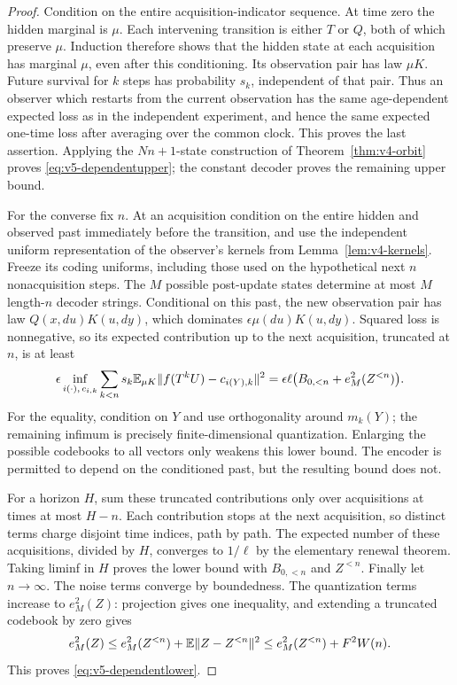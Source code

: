 \begin{proof}
Condition on the entire acquisition-indicator sequence. At time
zero the hidden marginal is $\mu$. Each intervening transition is
either $T$ or $Q$, both of which preserve $\mu$. Induction therefore
shows that the hidden state at each acquisition has marginal
$\mu$, even after this conditioning. Its observation pair has
law $\mu K$. Future survival for $k$ steps has probability $s_k$,
independent of that pair. Thus an observer which restarts from
the current observation has the same age-dependent expected loss
as in the independent experiment, and hence the same expected
one-time loss after averaging over the common clock. This proves
the last assertion. Applying the $Nn+1$-state construction of
Theorem~\ref{thm:v4-orbit} proves
\eqref{eq:v5-dependentupper}; the constant decoder proves the
remaining upper bound.

For the converse fix $n$. At an acquisition condition on the
entire hidden and observed past immediately before the transition,
and use the independent uniform representation of the observer's
kernels from Lemma~\ref{lem:v4-kernels}. Freeze its coding uniforms,
including those used on the hypothetical next $n$ nonacquisition
steps. The $M$ possible post-update states determine at most $M$
length-$n$ decoder strings. Conditional on this past, the new
observation pair has law $Q(x,du)K(u,dy)$, which dominates
$\epsilon\mu(du)K(u,dy)$. Squared loss is nonnegative, so its
expected contribution up to the next acquisition, truncated at
$n$, is at least
\[
 \epsilon\inf_{i(\cdot),\,c_{i,k}}
 \sum_{k<n}s_k\mathbb E_{\mu K}\|f(T^kU)-c_{i(Y),k}\|^2
 =\epsilon\ell\bigl(B_{0,<n}+e_M^2(Z^{<n})\bigr).
\]
For the equality, condition on $Y$ and use orthogonality around
$m_k(Y)$; the remaining infimum is precisely finite-dimensional
quantization. Enlarging the possible codebooks to all vectors
only weakens this lower bound. The encoder is permitted to depend
on the conditioned past, but the resulting bound does not.

For a horizon $H$, sum these truncated contributions only over
acquisitions at times at most $H-n$. Each contribution stops at
the next acquisition, so distinct terms charge disjoint time
indices, path by path. The expected number of these acquisitions,
divided by $H$, converges to $1/\ell$ by the elementary renewal
theorem. Taking liminf in $H$ proves the lower bound with
$B_{0,<n}$ and $Z^{<n}$. Finally let $n\to\infty$.
The noise terms converge by boundedness. The quantization terms
increase to $e_M^2(Z)$: projection gives one inequality, and
extending a truncated codebook by zero gives
\[
 e_M^2(Z)\le e_M^2(Z^{<n})+\mathbb E\|Z-Z^{<n}\|^2
 \le e_M^2(Z^{<n})+F^2W(n).
\]
This proves \eqref{eq:v5-dependentlower}.
\end{proof}

